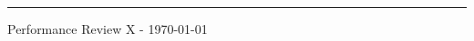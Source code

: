 \documentclass[10pt, a4paper]{article} %
\begin{document}
\textbf{\huge{}} %

\vspace{-10pt}
\rule{\columnwidth}{1pt}  %

Performance Review X - \today %

\end{document}
